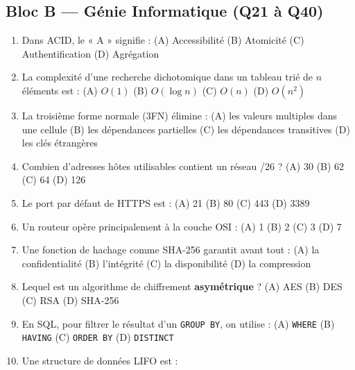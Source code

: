\subsection*{Bloc B --- Génie Informatique (Q21 à Q40)}

\begin{enumerate}[leftmargin=*, label=\textbf{Q\arabic*.}, start=21]
    \item Dans ACID, le « A » signifie :
    \newline (A) Accessibilité \quad (B) Atomicité \quad (C) Authentification \quad (D) Agrégation
    \item La complexité d'une recherche dichotomique dans un tableau trié de $n$ éléments est :
    \newline (A) $O(1)$ \quad (B) $O(\log n)$ \quad (C) $O(n)$ \quad (D) $O(n^2)$
    \item La troisième forme normale (3FN) élimine :
    \newline (A) les valeurs multiples dans une cellule \quad (B) les dépendances partielles
    \newline (C) les dépendances transitives \quad (D) les clés étrangères
    \item Combien d'adresses hôtes utilisables contient un réseau /26 ?
    \newline (A) 30 \quad (B) 62 \quad (C) 64 \quad (D) 126
    \item Le port par défaut de HTTPS est :
    \newline (A) 21 \quad (B) 80 \quad (C) 443 \quad (D) 3389
    \item Un routeur opère principalement à la couche OSI :
    \newline (A) 1 \quad (B) 2 \quad (C) 3 \quad (D) 7
    \item Une fonction de hachage comme SHA-256 garantit avant tout :
    \newline (A) la confidentialité \quad (B) l'intégrité \quad (C) la disponibilité \quad (D) la compression
    \item Lequel est un algorithme de chiffrement \textbf{asymétrique} ?
    \newline (A) AES \quad (B) DES \quad (C) RSA \quad (D) SHA-256
    \item En SQL, pour filtrer le résultat d'un \texttt{GROUP BY}, on utilise :
    \newline (A) \texttt{WHERE} \quad (B) \texttt{HAVING} \quad (C) \texttt{ORDER BY} \quad (D) \texttt{DISTINCT}
    \item Une structure de données LIFO est :

\end{enumerate}
